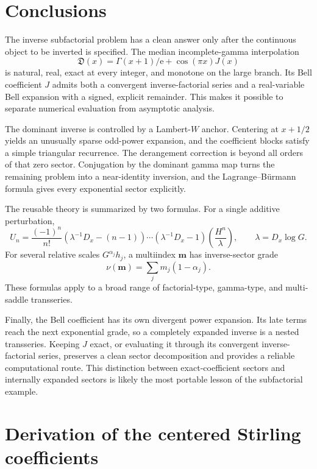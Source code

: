 \documentclass[11pt,oneside]{article}
\theoremstyle{plain}
\theoremstyle{definition}
\theoremstyle{remark}
\newcommand{\ee}{\mathrm{e}}
\newcommand{\Dfrak}{\mathfrak{D}}
\begin{document}
\section{Conclusions}
\label{sec:conclusion}

The inverse subfactorial problem has a clean answer only after the continuous
object to be inverted is specified.  The median incomplete-gamma interpolation
\[
 \Dfrak(x)=\Gamma(x+1)/\ee+\cos(\pi x)J(x)
\]
is natural, real, exact at every integer, and monotone on the large branch.
Its Bell coefficient \(J\) admits both a convergent inverse-factorial series
and a real-variable Bell expansion with a signed, explicit remainder.  This
makes it possible to separate numerical evaluation from asymptotic analysis.

The dominant inverse is controlled by a Lambert-\(W\) anchor.  Centering at
\(x+1/2\) yields an unusually sparse odd-power expansion, and the coefficient
blocks satisfy a simple triangular recurrence.  The derangement correction is
beyond all orders of that zero sector.  Conjugation by the dominant gamma map
turns the remaining problem into a near-identity inversion, and the
Lagrange--B\"urmann formula gives every exponential sector explicitly.

The reusable theory is summarized by two formulas.  For a single additive
perturbation,
\[
 U_n=\frac{(-1)^n}{n!}
 (\lambda^{-1}D_x-(n-1))\cdots(\lambda^{-1}D_x-1)
 \left(\frac{H^n}{\lambda}\right),
 \qquad \lambda=D_x\log G.
\]
For several relative scales \(G^{\alpha_j}h_j\), a multiindex \(\bm m\) has
inverse-sector grade
\[
 \nu(\bm m)=\sum_jm_j(1-\alpha_j).
\]
These formulas apply to a broad range of factorial-type, gamma-type, and
multi-saddle transseries.

Finally, the Bell coefficient has its own divergent power expansion.  Its late
terms reach the next exponential grade, so a completely expanded inverse is a
nested transseries.  Keeping \(J\) exact, or evaluating it through its
convergent inverse-factorial series, preserves a clean sector decomposition and
provides a reliable computational route.  This distinction between
exact-coefficient sectors and internally expanded sectors is likely the most
portable lesson of the subfactorial example.

\appendix

\section{Derivation of the centered Stirling coefficients}
\label{app:centered-Stirling}
\end{document}
